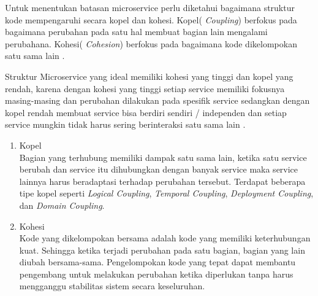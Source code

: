 Untuk menentukan batasan microservice perlu diketahui bagaimana struktur kode mempengaruhi secara kopel dan kohesi. Kopel( \textit{Coupling}) berfokus pada bagaimana perubahan pada satu hal membuat bagian lain mengalami perubahana. Kohesi( \textit{Cohesion}) berfokus pada bagaimana kode dikelompokan satu sama lain \cite{74C}. 

Struktur Microservice yang ideal memiliki kohesi yang tinggi dan kopel yang rendah, karena dengan kohesi yang tinggi setiap service memiliki fokusnya masing-masing dan perubahan dilakukan pada spesifik service sedangkan dengan kopel rendah membuat service bisa berdiri sendiri / independen dan setiap service mungkin tidak harus sering berinteraksi satu sama lain \cite{74C}.
\begin{enumerate}[leftmargin=1.3cm]
	\item Kopel \cite{74C}\\
	Bagian yang terhubung memiliki dampak satu sama lain, ketika satu service berubah dan service itu dihubungkan dengan banyak service maka  service lainnya harus beradaptasi terhadap perubahan tersebut. Terdapat beberapa tipe kopel seperti  \textit{Logical Coupling},  \textit{Temporal Coupling},  \textit{Deployment Coupling}, dan  \textit{Domain Coupling}.
	\item Kohesi \cite{74C}\\
	Kode yang dikelompokan bersama adalah kode yang memiliki keterhubungan kuat. Sehingga ketika terjadi perubahan pada satu bagian, bagian yang lain diubah bersama-sama. Pengelompokan kode yang tepat dapat membantu pengembang untuk melakukan perubahan ketika diperlukan tanpa harus mengganggu stabilitas sistem secara keseluruhan.
\end{enumerate}	

